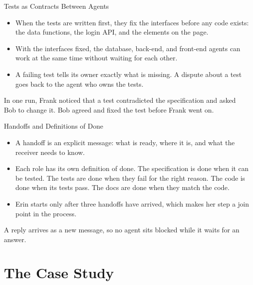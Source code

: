 \documentclass[aspectratio=169, table, 12pt]{beamer}
\begin{document}
\begin{frame}{{\Large Tests as Contracts Between Agents}}
  \vspace{10pt}
  \begin{itemize}
    \item When the tests are written first, they fix the interfaces before
          any code exists: the data functions, the login API, and the elements
          on the page.
    \item With the interfaces fixed, the database, back-end, and front-end
          agents can work at the same time without waiting for each other.
    \item A failing test tells its owner exactly what is missing. A dispute
          about a test goes back to the agent who owns the tests.
  \end{itemize}
  \vspace{6pt}
  {\small In one run, Frank noticed that a test contradicted the
  specification and asked Bob to change it. Bob agreed and fixed the test
  before Frank went on.}
\end{frame}

\begin{frame}{{\Large Handoffs and Definitions of Done}}
  \vspace{10pt}
  \begin{itemize}
    \item A handoff is an explicit message: what is ready, where it is, and
          what the receiver needs to know.
    \item Each role has its own definition of done. The specification is done
          when it can be tested. The tests are done when they fail for the
          right reason. The code is done when its tests pass. The docs are
          done when they match the code.
    \item Erin starts only after three handoffs have arrived, which makes her
          step a join point in the process.
  \end{itemize}
  \vspace{6pt}
  {\small A reply arrives as a new message, so no agent sits blocked while it
  waits for an answer.}
\end{frame}

\section{The Case Study}
\end{document}
